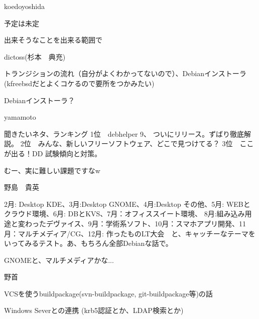 \begin{prework}{ koedoyoshida }

予定は未定

出来そうなことを出来る範囲で


\end{prework}

\begin{prework}{ dictoss(杉本　典充) }

トランジションの流れ（自分がよくわかってないので）、Debianインストーラ(kfreebsdだとよくコケるので要所をつかみたい)

Debianインストーラ？
\end{prework}

\begin{prework}{ yamamoto }

聞きたいネタ、ランキング
1位　debhelper 9、 ついにリリース。ずばり徹底解説。
2位　みんな、新しいフリーソフトウェア、どこで見つけてる？
3位　ここが出る！DD 試験傾向と対策。

むー、実に難しい課題ですなw
\end{prework}

\begin{prework}{ 野島　貴英 }

 2月: Desktop KDE、3月:Desktop GNOME、4月:Desktop その他、5月: WEBとクラウド環境、6月: DBとKVS、7月：オフィススイート環境、 8月:組み込み用途と変わったデヴァイス、9月：学術系ソフト、10月：スマホアプリ開発、11月：マルチメディア/CG、12月: 作ったものLT大会　と、キャッチーなテーマをいってみるテスト。あ、もちろん全部Debianな話で。

 GNOMEと、マルチメディアかな...

\end{prework}

\begin{prework}{ 野首 }

VCSを使うbuildpackage(svn-buildpackage, git-buildpackage等)の話

Windows Severとの連携 (krb5認証とか、LDAP検索とか)

\end{prework}
